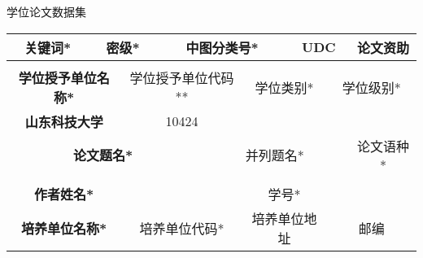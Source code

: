 
\newpage\thispagestyle{empty}
\begin{center}\setcounter{page}{1}\end{center}
\begin{center}{\hei\fontsize{18pt}{18pt}\selectfont\setlength{\parskip}{0.5\baselineskip} 学位论文数据集}\end{center}   %

{

\begin{table}[htbp]
    \centering\fontsize{10.5pt}{10.5pt}\selectfont\hei \renewcommand{\arraystretch}{2.3}
    \begin{tabular}{|c|c|c|c|c|c|c|c|c|c|c|c|c|c|c|c|c|c|c|c|}
        \hline
        \multicolumn{4}{|c|}{\textbf{关键词*}} & \multicolumn{4}{c|}{密级*} & \multicolumn{4}{|c|}{中图分类号*}  & \multicolumn{4}{c|}{UDC}& \multicolumn{4}{c|}{论文资助} \\
        \hline
        \multicolumn{4}{|c|}{} & \multicolumn{4}{c|}{} & \multicolumn{4}{|c|}{}  & \multicolumn{4}{c|}{}&\multicolumn{4}{c|}{} \\
        \hline
        \multicolumn{5}{|c|}{\textbf{学位授予单位名称*}} & \multicolumn{5}{c|}{学位授予单位代码**} & \multicolumn{5}{c|}{学位类别*}  & \multicolumn{5}{|c|}{学位级别*}\\
        \hline
        \multicolumn{5}{|c|}{\textbf{山东科技大学}} & \multicolumn{5}{c|}{10424} & \multicolumn{5}{c|}{}  & \multicolumn{5}{|c|}{}\\
        \hline
        \multicolumn{9}{|c|}{\textbf{论文题名*}} & \multicolumn{7}{c|}{并列题名*} & \multicolumn{4}{c|}{论文语种*}  \\
        \hline
        \multicolumn{9}{|c|}{\textbf{}} & \multicolumn{7}{c|}{} & \multicolumn{4}{c|}{}  \\
        \hline
        \multicolumn{5}{|c|}{\textbf{作者姓名*}} & \multicolumn{5}{|c|}{} & \multicolumn{5}{|c|}{学号*}  & \multicolumn{5}{|c|}{}\\
        \hline
        \multicolumn{5}{|c|}{\textbf{培养单位名称*}} & \multicolumn{5}{|c|}{培养单位代码*} & \multicolumn{5}{|c|}{培养单位地址}  & \multicolumn{5}{|c|}{邮编}\\

\end{tabular}
\end{table}}
